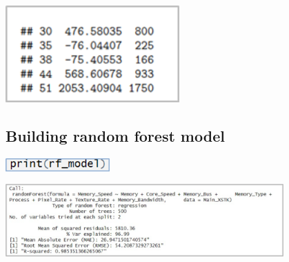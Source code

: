 \begin{center}
    \includegraphics[width=0.5\textwidth]{test-accuracy9.png}
\end{center}

\subsection{Building random forest model}

\begin{center}
    \includegraphics[width=0.3\textwidth]{build-forest1.png}
\end{center}

\begin{center}
    \includegraphics[width=0.8\textwidth]{build-forest2.png}
\end{center}

